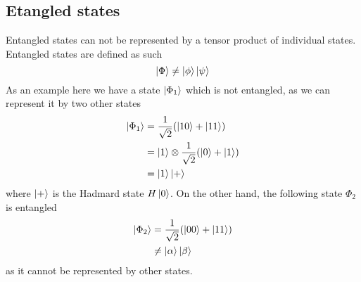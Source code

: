 \subsection{Etangled states}
Entangled states can not be represented by a tensor product of individual states. 
Entangled states are defined as such
\begin{equation}
    \ket{\Phi} \neq \ket{\phi} \ket{\psi}
\end{equation}
As an example here we have a state $\ket{\Phi_1}$ which is not entangled, as we can represent it by two other states
\begin{equation}
\begin{split}
\ket{\Phi_1} &= \frac{1}{\sqrt{2}} ( \ket{10} + \ket{11}) \\ 
&= \ket{1}\otimes \frac{1}{\sqrt{2}} ( \ket{0} + \ket{1})\\ 
&= \ket{1} \ket{+}
\end{split}
\end{equation}
where $\ket +$ is the Hadmard  state $H \ket{0}$.
On the other hand, the following state $\Phi_2$ is entangled 
\begin{equation}
\begin{split}
\ket{\Phi_2} &= \frac{1}{\sqrt{2}} ( \ket{00} + \ket{11}) \\
&\neq \ket{\alpha}\ket{\beta}
\end{split}
\end{equation}
as it cannot be represented by other states.
